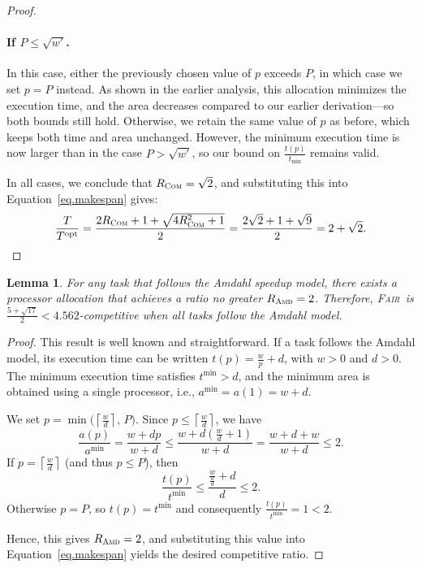 \documentclass{article}
\newtheorem{lemma}{Lemma}
\newcommand\fair{\textsc{Fair}\xspace}
\newcommand\ratio{R\xspace}
\newcommand\opt{\textnormal{opt}\xspace}
\newcommand\COM{\textsc{Com}\xspace}
\newcommand\AMD{\textsc{Amd}\xspace}
\begin{document}
\begin{proof}
\paragraph{If \( P \leq \sqrt{w'} \).}

In this case, either the previously chosen value of \( p \) exceeds \( P \), in which case we set \( p = P \) instead. As shown in the earlier analysis, this allocation minimizes the execution time, and the area decreases compared to our earlier derivation—so both bounds still hold. Otherwise, we retain the same value of \( p \) as before, which keeps both time and area unchanged. However, the minimum execution time is now larger than in the case \( P > \sqrt{w'} \), so our bound on \( \frac{t(p)}{t_{\min}} \) remains valid.


In all cases, we conclude that $\ratio_{\COM} = \sqrt{2}$, and substituting this into Equation~\ref{eq.makespan} gives:
\[
\frac{T}{T^{\opt}} = \frac{2\ratio_{\COM} + 1 + \sqrt{4\ratio_{\COM}^2 + 1}}{2} = \frac{2\sqrt{2} + 1 + \sqrt{9}}{2} = 2 + \sqrt{2}.
\]

\end{proof}


\begin{lemma}\label{lem.amdahl}
For any task that follows the Amdahl speedup model, there exists a processor allocation that achieves a ratio no greater $\ratio_{\AMD}=2$. Therefore, \fair\ is $\frac{5+\sqrt{17}}{2} < 4.562$-competitive when all tasks follow the Amdahl model.
\end{lemma}

\begin{proof}
This result is well known and straightforward. If a task follows the Amdahl model, its execution time can be written $t(p)=\frac{w}{p}+d$, with $w>0$ and $d>0$. The minimum execution time satisfies $t^{\min}>d$, and the minimum area is obtained using a single processor, i.e., $a^{\min}=a(1)=w+d$.

We set $p=\min\!\bigl(\left\lceil \frac{w}{d} \right\rceil,\,P\bigr)$. Since $p\le\left\lceil \frac{w}{d} \right\rceil$, we have
\[
\frac{a(p)}{a^{\min}}
    =\frac{w+dp}{w+d}
    \le\frac{w+d\left(\frac{w}{d}+1\right)}{w+d}
    =\frac{w+d+w}{w+d}\le 2 .
\]
If $p=\left\lceil \tfrac{w}{d} \right\rceil$ (and thus $p\le P$), then
\[
\frac{t(p)}{t^{\min}}
    \le\frac{\frac{w}{\frac{w}{d}}+d}{d}
    \le 2 .
\]
Otherwise $p=P$, so $t(p)=t^{\min}$ and consequently $\tfrac{t(p)}{t^{\min}}=1<2$.

Hence, this gives $\ratio_{\AMD}=2$, and substituting this value into Equation~\ref{eq.makespan} yields the desired competitive ratio.
\end{proof}
\end{document}
